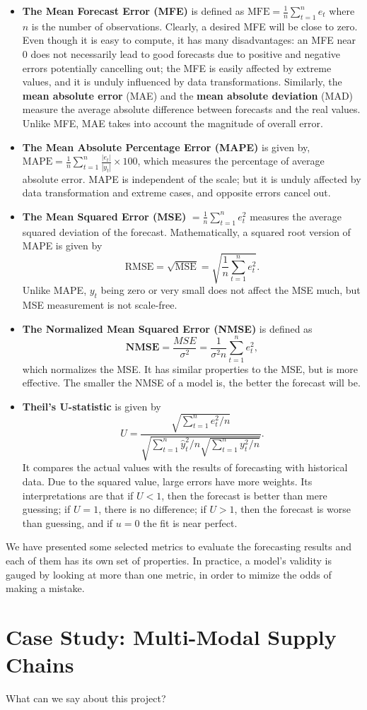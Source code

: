  \begin{itemize}[noitemsep]
\item \textbf{The Mean Forecast Error (MFE)} is defined as $\mathrm{MFE}=\frac{1}{n} \sum_{t=1}^{n} e_t $ where $n$ is the number of observations. Clearly, a desired MFE will be close to zero. Even though it is easy to compute, it has many disadvantages: an MFE near 0 does not necessarily lead to good forecasts due to positive and negative errors potentially cancelling out; the MFE is easily affected by extreme values, and it is unduly influenced by data transformations. Similarly, the \textbf{mean absolute error} (MAE) and the \textbf{mean absolute deviation} (MAD) measure the average absolute difference between forecasts and the real values. Unlike MFE, MAE takes into account the magnitude of overall error. 
\item \textbf{The Mean Absolute Percentage Error (MAPE)} is given by, $ \mathrm{MAPE}=\frac{1}{n} \sum_{t=1}^{n} \frac{\left|e_t\right|}{\left|y_t\right|} \times 100 $, which measures the percentage of average absolute error. MAPE is independent of the scale; but it is unduly affected by data transformation and extreme cases, and opposite errors cancel out.
\item \textbf{The Mean Squared Error (MSE)} $= \frac{1}{n} \sum_{t=1}^n {e^2_t}$ measures the average squared deviation of the forecast. Mathematically, a squared root version of MAPE is given by $$\mathrm{RMSE}=\sqrt{\mathrm{MSE}}=\sqrt{\frac{1}{n} \sum_{t=1}^{n} e^2_t}.$$ Unlike MAPE, $y_t$ being zero or very small does not affect the MSE much, but MSE measurement is not scale-free. 
\item \textbf{The Normalized Mean Squared Error (NMSE)} is defined as $$\mathbf{NMSE} =\frac{MSE}{\sigma^2}=\frac{1}{\sigma^2 n} \sum_{t=1}^{n} e^2_t,$$ which normalizes the MSE. It has similar properties to the MSE, but is more effective. The smaller the NMSE of a model is, the better the forecast will be. 
\item \textbf{Theil's U-statistic} is given by $$ U=\frac{\sqrt{\sum_{t=1}^{n} e^2_t /n}}{\sqrt{\sum_{t=1}^{n} \hat{y}^2_t /n \sqrt{\sum_{t=1}^{n} y^2_t /n}}}.$$ It compares the actual values with the results of forecasting with historical data. Due to the squared value, large errors have more weights. Its interpretations are that if $U<1$, then the forecast is better than mere guessing; if $U=1$, there is no difference; if $U>1$, then the forecast is worse than guessing, and if $u=0$ the fit is near perfect. 
\end{itemize}
We have presented some selected metrics to evaluate the forecasting results and each of them has its own set of properties. In practice, a model's validity is gauged by looking at more than one metric, in order to mimize the odds of making a mistake. 
\section{Case Study: Multi-Modal Supply Chains} What can we say about this project? \newpage\newpage
{}

